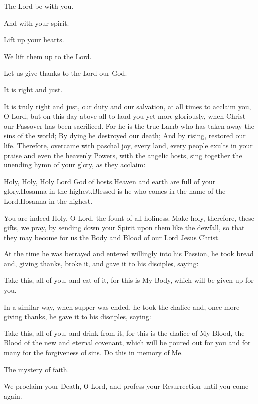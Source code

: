 \pr The Lord be with you.

\be And with your spirit.

\pr Lift up your hearts.

\be We lift them up to the Lord. 

\pr Let us give thanks to the Lord our God. 

\be It is right and just. 

\pr It is truly right and just, our duty and our salvation, at all times to acclaim you, O Lord, but on this day above all to laud you yet more gloriously, when Christ our Passover has been sacrificed. For he is the true Lamb who has taken away the sins of the world; By dying he destroyed our death; And by rising, restored our life. Therefore, overcame with paschal joy, every land, every people exults in your praise and even the heavenly Powers, with the angelic hosts, sing together the unending hymn of your glory, as they acclaim:

\be Holy, Holy, Holy Lord God of hosts.\redast Heaven and earth are full of your glory.\redast Hosanna in the highest.\redast Blessed is he who comes in the name of the Lord.\redast Hosanna in the highest.

\pr You are indeed Holy, O Lord, the fount of all holiness. Make holy, therefore, these gifts, we pray, by sending down your Spirit upon them like the dewfall, so that they may become for us the Body and Blood of our Lord Jesus Christ.

\pr At the time he was betrayed and entered willingly into his Passion, he took bread and, giving thanks, broke it, and gave it to his disciples, saying:

\vspace{1em}
\eu Take this, all of you, and eat of it, for this is My Body, which will be given up for you.
\vspace{0.8em}

\pr In a similar way, when supper was ended, he took the chalice and, once more giving thanks, he gave it to his disciples, saying:

\vspace{1em}
\eu Take this, all of you, and drink from it, for this is the chalice of My Blood, the Blood of the new and eternal covenant, which will be poured out for you and for many for the forgiveness of sins. Do this in memory of Me.
\vspace{0.8em}

\pr The mystery of faith.

\be We proclaim your Death, O Lord, and profess your Resurrection until you come again.

